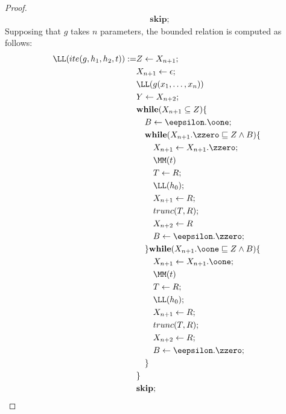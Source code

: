 \begin{proof}
\begin{align*}
%
& \mathbf{skip};
\end{align*}
%
Supposing that $g$ takes $n$ parameters,
the bounded relation is computed as follows:
\begin{align*}
\LL(ite(g,h_1,h_2,t)) := &Z \leftarrow X_{n+1}; \\
%
& X_{n+1} \leftarrow \epsilon; \\
%
& \LL(g(x_1,\dots, x_n)) \\
%
& Y \leftarrow X_{n+2}; \\
%
& \mathbf{while}(X_{n+1} \subseteq Z)\{ \\
%
& \ \ \ B \leftarrow {\eepsilon.\oone}; \\
%
& \ \ \ \mathbf{while}(X_{n+1}.{\zzero}
\sqsubseteq Z \wedge B) \{ \\
%
& \ \ \ \ \ \ X_{n+1} \leftarrow X_{n+1}.{\zzero}; \\
%
& \ \ \ \ \ \ \MM(t) \\
%
& \ \ \ \ \ \ T \leftarrow R; \\
%
& \ \ \ \ \ \ \LL(h_0); \\
%
& \ \ \ \ \ \ X_{n+1} \leftarrow R; \\
%
& \ \ \ \ \ \ trunc(T,R); \\
%
& \ \ \ \ \ \ X_{n+2} \leftarrow R \\
%
& \ \ \ \ \ \ B \leftarrow {\eepsilon.\zzero}; \\
%
& \ \ \ \} \mathbf{while}(X_{n+1}.{\oone}
\sqsubseteq Z \wedge B) \{ \\
%
& \ \ \ \ \ \ X_{n+1} \leftarrow X_{n+1}.{\oone}; \\
%
& \ \ \ \ \ \ \MM(t) \\
%
& \ \ \ \ \ \ T \leftarrow R; \\
%
& \ \ \ \ \ \ \LL(h_0); \\
%
& \ \ \ \ \ \ X_{n+1} \leftarrow R; \\
%
& \ \ \ \ \ \ trunc(T,R); \\
%
& \ \ \ \ \ \ X_{n+2} \leftarrow R; \\
%
& \ \ \ \ \ \ B \leftarrow {\eepsilon.\zzero}; \\
%
& \ \ \ \} \\
%
& \} \\
%
& \mathbf{skip};
\end{align*}
\end{proof}











